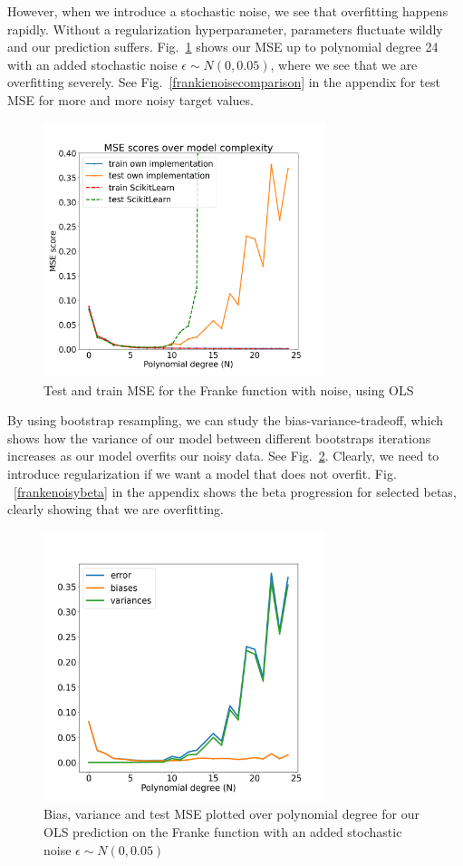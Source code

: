 \documentclass[twocolumn,10pt,cleanfoot]{asme2ej}
\begin{document}
However, when we introduce a stochastic noise, we see that overfitting happens rapidly. Without a regularization hyperparameter, parameters fluctuate wildly and our prediction suffers. Fig.~\ref{frankenoisemse} shows our MSE up to polynomial degree 24 with an added stochastic noise $\epsilon \sim N(0,0.05)$, where we see that we are overfitting severely. See Fig.~\ref{frankienoisecomparison} in the appendix for test MSE for more and more noisy target values. 

\begin{figure} 
\centerline{\includegraphics[width=3.25in]{figure/frankenoisemse.png}}
\caption{Test and train MSE for the Franke function with noise, using OLS}
\label{frankenoisemse}
\end{figure}

By using bootstrap resampling, we can study the bias-variance-tradeoff, which shows how the variance of our model between different bootstraps iterations increases as our model overfits our noisy data. See Fig.~\ref{frankiebiasvariance}. Clearly, we need to introduce regularization if we want a model that does not overfit. Fig. ~\ref{frankenoisybeta} in the appendix shows the beta progression for selected betas, clearly showing that we are overfitting.

\begin{figure} 
\centerline{\includegraphics[width=3.25in]{figure/frankiebiasvariance.png}}
\caption{Bias, variance and test MSE plotted over polynomial degree for our OLS prediction on the Franke function with an added stochastic noise $\epsilon \sim N(0,0.05)$}
\label{frankiebiasvariance}
\end{figure}
\end{document}
